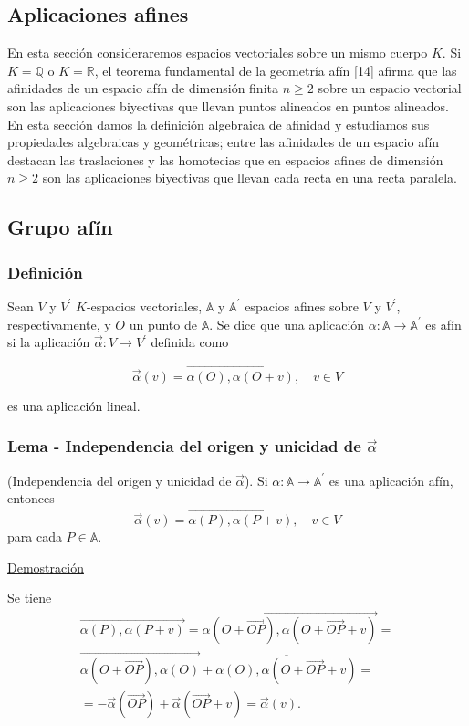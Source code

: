 \documentclass[12pt, a4paper, ones, notitlepage, openany,titlepage]{article}
\newcommand{\demostracion}{\noindent\underline{Demostración}}
\begin{document}
\subsection{Aplicaciones afines}
En esta sección consideraremos espacios vectoriales sobre un mismo cuerpo $K$. Si $K=\mathbb{Q}$ o $K=\mathbb{R}$, el teorema fundamental de la geometría afín [14] afirma que las afinidades de un espacio afín de dimensión finita $n \geq 2$ sobre un espacio vectorial son las aplicaciones biyectivas que llevan puntos alineados en puntos alineados. En esta sección damos la definición algebraica de afinidad y estudiamos sus propiedades algebraicas y geométricas; entre las afinidades de un espacio afín destacan las traslaciones y las homotecias que en espacios afines de dimensión $n \geq 2$ son las aplicaciones biyectivas que llevan cada recta en una recta paralela.

\subsection{Grupo afín}

\subsubsection{Definición}
Sean $V$ y $V^{\prime}$ $K$-espacios vectoriales, $\mathbb{A}$ y $\mathbb{A}^{\prime}$ espacios afines sobre $V$ y $V^{\prime}$, respectivamente, y $O$ un punto de $\mathbb{A}$. Se dice que una aplicación $\alpha: \mathbb{A} \rightarrow \mathbb{A}^{\prime}$ es afín si la aplicación $\vec{\alpha}: V \rightarrow V^{\prime}$ definida como

$$
\vec{\alpha}(v)=\overrightarrow{\alpha(O), \alpha(O+v)}, \quad v \in V
$$

es una aplicación lineal.

\subsubsection{Lema - Independencia del origen y unicidad de $\overrightarrow{\alpha}$}
\noindent (Independencia del origen y unicidad de $\overrightarrow{\alpha}$). Si $\alpha: \mathbb{A} \rightarrow \mathbb{A}^{\prime}$ es una aplicación afín, entonces
$$
\vec{\alpha}(v)=\overrightarrow{\alpha(P), \alpha(P+v)}, \quad v \in V
$$
para cada $P \in \mathbb{A}$.

\demostracion

\noindent Se tiene
\begin{gather*}
\overrightarrow{\alpha(P), \alpha(P+v)} =\overrightarrow{\alpha(O+\overrightarrow{O P}), \alpha(O+\overrightarrow{O P}+v)}=\\\overrightarrow{\alpha(O+\overrightarrow{O P}), \alpha(O)}+\overline{\alpha(O), \alpha(O+\overrightarrow{O P}+v)} = \\ =-\vec{\alpha}(\overrightarrow{O P})+\vec{\alpha}(\overrightarrow{O P}+v)=\vec{\alpha}(v).
\end{gather*}
\end{document}
